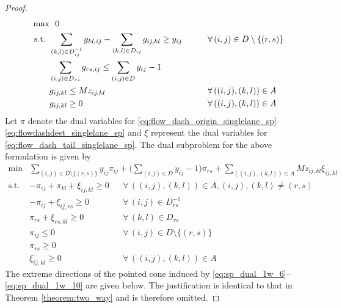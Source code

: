 \documentclass[10pt,a4paper]{amsart}
\newcommand{\countvar}[4]{z_{#1#2,#3#4}}
\newcommand{\drivevar}[2]{y_{#1#2}}
\newcommand{\exitset}{\{(\exitx, \exity)\}}
\newcommand{\exitx}{r}
\newcommand{\exity}{s}
\newcommand{\flowvardash}[4]{g_{#1#2,#3#4}}
\newcommand{\gridadjset}[2]{D_{#1#2}}
\newcommand{\gridarcset}{A}
\newcommand{\gridinvadjset}[2]{D^{-1}_{#1#2}}
\newcommand{\validdriveset}{D}
\begin{document}
\begin{proof}
\begin{align}
    \max & \, \, \, \, 0  && \notag \\
     \text{s.t. } & \sum_{(k,l) \in \gridinvadjset{i}{j}} \flowvardash{k}{l}{i}{j} - \sum_{(k,l) \in \gridadjset{i}{j}} \flowvardash{i}{j}{k}{l} \geq \drivevar{i}{j}  \qquad && \forall \, (i,j) \in \validdriveset \setminus \exitset \label{eq:flow_dash_origin_singlelane_sp}\\
    & \sum_{(i,j) \in \gridadjset{\exitx}{\exity}} \flowvardash{\exitx}{\exity}{i}{j} \leq \sum_{(i,j) \in \validdriveset} \drivevar{i}{j}  - 1 \qquad && \label{eq:flowdashdest_singlelane_sp}\\
    & \flowvardash{i}{j}{k}{l} \leq M \countvar{i}{j}{k}{l}  \qquad && \forall \, ((i,j), (k,l)) \in \gridarcset \label{eq:flow_dash_tail_singlelane_sp}\\
    & \flowvardash{i}{j}{k}{l} \geq 0 \qquad && \forall \, ((i,j), (k,l)) \in \gridarcset \label{eq:g_non_negative_sp}
\end{align}
Let $\pi$ denote the dual variables for \eqref{eq:flow_dash_origin_singlelane_sp}--\eqref{eq:flowdashdest_singlelane_sp} and $\xi$ represent the dual variables for \eqref{eq:flow_dash_tail_singlelane_sp}. 
The dual subproblem for the above formulation is given by 
\begin{align}
    \min &\sum_{(i,j) \in \validdriveset \setminus \exitset} \drivevar{i}{j}\pi_{ij} + \Bigg(\sum_{(i,j) \in \validdriveset} \drivevar{i}{j}  - 1 \Bigg) \pi_{rs} + \sum_{((i,j), (k,l)) \in \gridarcset}  M \countvar{i}{j}{k}{l} \xi_{ij, kl} \label{eq:sp_dual_1w}
\end{align}
\begin{align}
     \text{s.t. } & - \pi_{ij} + \pi_{kl} + \xi_{ij, kl} \geq 0 && \forall \, ((i,j), (k,l)) \in \gridarcset, (i, j), (k, l) \neq (r, s)  \label{eq:sp_dual_1w_6} \\
     & - \pi_{ij} + \xi_{ij, rs} \geq 0 && \forall \,  (i,j) \in \gridinvadjset{r}{s}  \label{eq:sp_dual_1w_7} \\
    & \pi_{rs} + \xi_{rs, kl} \geq 0 && \forall \,  (k,l) \in \gridadjset{r}{s}  \label{eq:sp_dual_1w_8} \\
    & \pi_{ij} \leq 0 && \forall \, (i,j) \in \validdriveset \setminus \{(r, s)\} \label{eq:sp_dual_1w_9} \\
    & \pi_{rs} \geq 0 && \label{eq:sp_dual_1w_9.5} \\
     & \xi_{ij, kl} \geq 0 && \forall \, ((i,j), (k,l)) \in \gridarcset \label{eq:sp_dual_1w_10} 
\end{align}
The extreme directions of the pointed cone induced by \eqref{eq:sp_dual_1w_6}--\eqref{eq:sp_dual_1w_10} are given below. The justification is identical to that in Theorem \ref{theorem:two_way} and is therefore omitted.

\end{proof}
\end{document}
